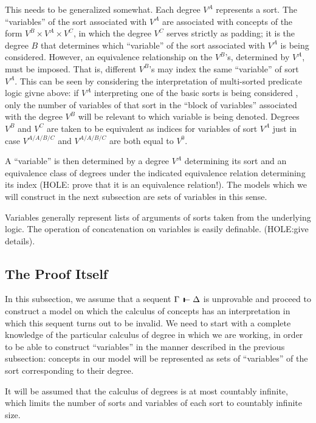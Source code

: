 \documentclass{article}
\def\joinrelm{\mathrel{\mkern-7mu}}
\def\relbar{\mathrel{\smash-}}
\def\tailpiece{\rule{.02in}{5pt}}
\def\ltstile{\mathrel{\tailpiece\joinrelm\relbar}}
\newcommand{\ljudge}[2]{{#1}\: \ltstile   {#2}}
\begin{document}
This needs to be generalized somewhat.  Each degree $V^A$ represents a
sort.  The ``variables'' of the sort associated with $V^A$ are
associated with concepts of the form $V^B \times V^A \times V^C$, in
which the degree $V^C$ serves strictly as padding; it is the degree
$B$ that determines which ``variable'' of the sort associated with
$V^A$ is being considered.  However, an equivalence relationship on
the $V^B$'s, determined by $V^A$, must be imposed.  That is, different
$V^B$'s may index the same ``variable'' of sort $V^A$.  This can be
seen by considering the interpretation of multi-sorted predicate logic
givne above: if $V^A$ interpreting one of the basic sorts is being
considered , only the number of variables of that sort in the ``block
of variables'' associated with the degree $V^B$ will be relevant to
which variable is being denoted.  Degrees $V^B$ and $V^C$ are taken to
be equivalent as indices for variables of sort $V^A$ just in case
$V^{A/A/B/C}$ and $V^{A/A/B/C}$ are both equal to $V^0$.

A ``variable'' is then determined by a degree $V^A$ determining its
sort and an equivalence class of degrees under the indicated
equivalence relation determining its index (HOLE: prove that it is an
equivalence relation!).  The models which we will construct in the
next subsection are sets of variables in this sense.

Variables generally represent lists of arguments of sorts taken from the
underlying logic.  The operation of concatenation on variables is easily
definable.  (HOLE:give details).

\subsection{The Proof Itself}

In this subsection, we assume that a sequent $\ljudge{\Gamma}{\Delta}$
is unprovable and proceed to construct a model on which the calculus
of concepts has an interpretation in which this sequent turns out to
be invalid.  We need to start with a complete knowledge of the
particular calculus of degree in which we are working, in order to be
able to construct ``variables'' in the manner described in the
previous subsection: concepts in our model will be represented as sets
of ``variables'' of the sort corresponding to their degree.

It will be assumed that the calculus of degrees is at most countably
infinite, which limits the number of sorts and variables of each sort
to countably infinite size.
\end{document}
